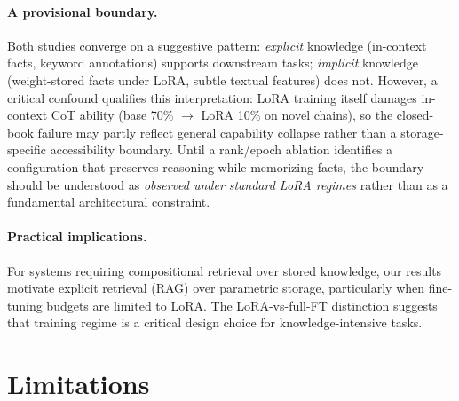 \documentclass[11pt]{article}
\begin{document}
\paragraph{A provisional boundary.} Both studies converge on a suggestive pattern: \emph{explicit} knowledge (in-context facts, keyword annotations) supports downstream tasks; \emph{implicit} knowledge (weight-stored facts under LoRA, subtle textual features) does not. However, a critical confound qualifies this interpretation: LoRA training itself damages in-context CoT ability (base 70\% $\rightarrow$ LoRA 10\% on novel chains), so the closed-book failure may partly reflect general capability collapse rather than a storage-specific accessibility boundary. Until a rank/epoch ablation identifies a configuration that preserves reasoning while memorizing facts, the boundary should be understood as \emph{observed under standard LoRA regimes} rather than as a fundamental architectural constraint.

\paragraph{Practical implications.} For systems requiring compositional retrieval over stored knowledge, our results motivate explicit retrieval (RAG) over parametric storage, particularly when fine-tuning budgets are limited to LoRA. The LoRA-vs-full-FT distinction \cite{balesni2024twohop} suggests that training regime is a critical design choice for knowledge-intensive tasks.

\section{Limitations}
\end{document}
